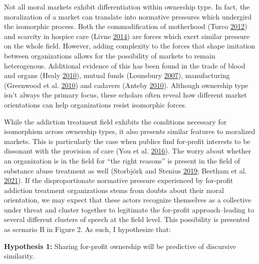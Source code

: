 \documentclass[
  12pt,
]{article}
\begin{document}
Not all moral markets exhibit differentiation within ownership type. In fact, the moralization of a market can translate into normative pressures which undergird the isomorphic process. Both the commodification of motherhood (Turco \protect\hyperlink{ref-turco2012}{2012}) and scarcity in hospice care (Livne \protect\hyperlink{ref-livne2014}{2014}) are forces which exert similar pressure on the whole field. However, adding complexity to the forces that shape imitation between organizations allows for the possibility of markets to remain heterogenous. Additional evidence of this has been found in the trade of blood and organs (Healy \protect\hyperlink{ref-healy2010}{2010}), mutual funds (Lounsbury \protect\hyperlink{ref-lounsbury2007}{2007}), manufacturing (Greenwood et al. \protect\hyperlink{ref-greenwood2010}{2010}) and cadavers (Anteby \protect\hyperlink{ref-anteby2010}{2010}). Although ownership type isn't always the primary focus, these scholars often reveal how different market orientations can help organizations resist isomorphic forces.

\vspace{12pt}

While the addiction treatment field exhibits the conditions necessary for isomorphism across ownership types, it also presents similar features to moralized markets. This is particularly the case when publics find for-profit interests to be dissonant with the provision of care (You et al. \protect\hyperlink{ref-you2016}{2016}). The worry about whether an organization is in the field for ``the right reasons'' is present in the field of substance abuse treatment as well (Storbjörk and Stenius \protect\hyperlink{ref-storbjork2019}{2019}; Beetham et al. \protect\hyperlink{ref-beetham2021}{2021}). If the disproportionate normative pressure experienced by for-profit addiction treatment organizations stems from doubts about their moral orientation, we may expect that these actors recognize themselves as a collective under threat and cluster together to legitimate the for-profit approach--leading to several different clusters of speech at the field level. This possibility is presented as scenario B in Figure 2. As such, I hypothesize that:

\vspace{12pt}

\textbf{Hypothesis 1:} Sharing for-profit ownership will be predictive of discursive similarity.

\vspace{12pt}
\end{document}
